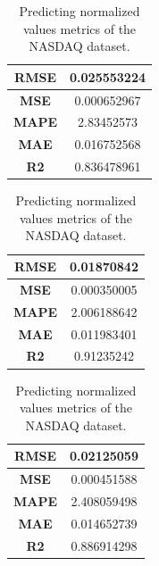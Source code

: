 \begin{table}[H]
	\centering
	\begin{minipage}{0.3\textwidth}
		\centering
		\begin{tabular}{|c|c|}
			\hline
			\textbf{RMSE} & 0.025553224 \\
			\hline
			\textbf{MSE}  & 0.000652967 \\
			\hline
			\textbf{MAPE} & 2.83452573  \\
			\hline
			\textbf{MAE}  & 0.016752568 \\
			\hline
			\textbf{R2}   & 0.836478961 \\
			\hline
		\end{tabular}
	\end{minipage}
	\begin{minipage}{0.3\textwidth}
		\centering
		\begin{tabular}{|c|c|}
			\hline
			\textbf{RMSE} & 0.01870842  \\
			\hline
			\textbf{MSE}  & 0.000350005 \\
			\hline
			\textbf{MAPE} & 2.006188642 \\
			\hline
			\textbf{MAE}  & 0.011983401 \\
			\hline
			\textbf{R2}   & 0.91235242  \\
			\hline
		\end{tabular}
	\end{minipage}
	\begin{minipage}{0.3\textwidth}
		\centering
		\begin{tabular}{|c|c|}
			\hline
			\textbf{RMSE} & 0.02125059  \\
			\hline
			\textbf{MSE}  & 0.000451588 \\
			\hline
			\textbf{MAPE} & 2.408059498 \\
			\hline
			\textbf{MAE}  & 0.014652739 \\
			\hline
			\textbf{R2}   & 0.886914298 \\
			\hline
		\end{tabular}
	\end{minipage}
	\caption{Predicting normalized values metrics of the NASDAQ dataset.}
	\label{metric:nasdaq_nor}
\end{table}
